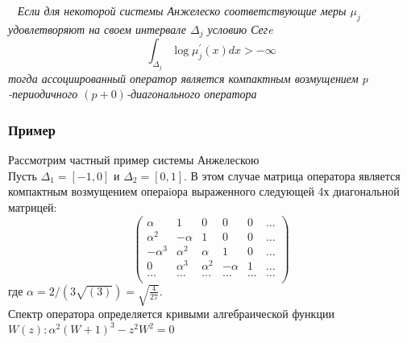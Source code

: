 \begin{teor} \rm ~\cite{KaliaguineAA1} \textit{
Если для некоторой системы Анжелеско соответствующие меры $\mu_j$
удовлетворяют на своем интервале $\Delta_j$ условию Сегe
$$
\int_{\Delta_j} {\log \mu_j^{'}(x) dx} > -\infty
$$
тогда ассоциированный оператор является компактным возмущением
$p$-периодичного $(p+0)$-диагонального оператора}
\end{teor}

\subsubsection{Пример} Рассмотрим частный
пример системы Анжелескою \\Пусть $\Delta_1=[-1,0]$ и
$\Delta_2=[0,1]$. В этом случае матрица оператора является
компактным возмущением операiора выраженного
следующей 4х диагональной матрицей: $$%
\left(
\begin{array}{cccccccc}
\alpha & 1 & 0 & 0 & 0 & \ldots \\
\alpha^2 & -\alpha & 1 & 0 & 0 & \ldots \\
-\alpha^3 & \alpha^2 & \alpha & 1 & 0 & \ldots \\
0 & \alpha^3 & \alpha^2 & -\alpha & 1 & \ldots \\
\ldots & \ldots & \ldots & \ldots & \ldots & \ldots \\
\end{array}
\right) $$%
где $\alpha=2/(3\sqrt{(3)})=\displaystyle\sqrt{\frac{4}{27}}$. \\
Спектр оператора определяется кривыми алгебраической функции
$W(z):
\alpha^2(W+1)^3-z^2W^2=0$ \\

